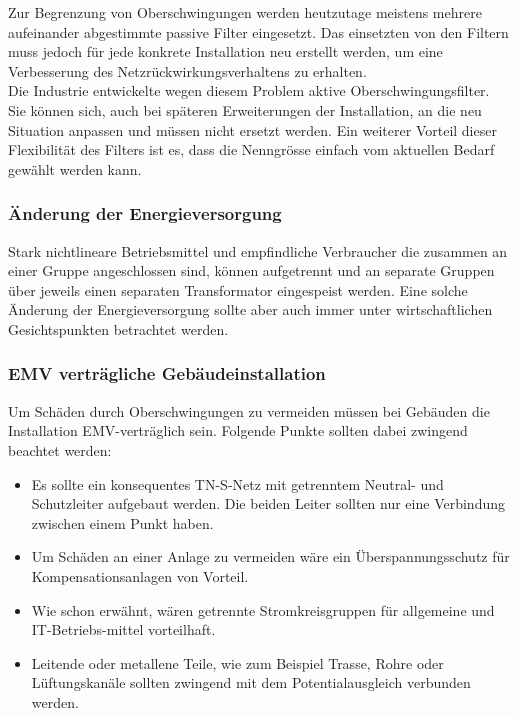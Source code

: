 Zur Begrenzung von Oberschwingungen werden heutzutage  meistens mehrere aufeinander abgestimmte passive Filter eingesetzt. Das einsetzten von den Filtern muss jedoch für jede konkrete Installation neu erstellt werden, um eine Verbesserung des Netzrückwirkungsverhaltens zu erhalten.\\
Die Industrie entwickelte wegen diesem Problem aktive Oberschwingungsfilter. Sie können sich, auch bei späteren Erweiterungen der Installation, an die neu Situation anpassen und müssen nicht ersetzt werden. Ein weiterer Vorteil dieser Flexibilität des Filters ist es, dass die Nenngrösse einfach vom aktuellen Bedarf gewählt werden kann.     

\subsubsection{Änderung der Energieversorgung}

Stark nichtlineare Betriebsmittel und empfindliche Verbraucher die zusammen an einer Gruppe angeschlossen sind, können aufgetrennt und an separate Gruppen über jeweils einen separaten Transformator eingespeist werden. Eine solche Änderung der Energieversorgung sollte aber auch immer unter wirtschaftlichen Gesichtspunkten betrachtet werden.

\subsubsection{EMV verträgliche Gebäudeinstallation}

Um Schäden durch Oberschwingungen zu vermeiden müssen bei Gebäuden die Installation EMV-verträglich sein.
Folgende Punkte sollten dabei zwingend beachtet werden:

\begin{itemize}
	\item Es sollte ein konsequentes TN-S-Netz mit getrenntem Neutral- und Schutzleiter aufgebaut werden. Die beiden Leiter sollten nur eine Verbindung zwischen einem Punkt haben.
	\item Um Schäden an einer Anlage zu vermeiden wäre ein Überspannungsschutz für Kompensationsanlagen von Vorteil.
	\item Wie schon erwähnt, wären getrennte Stromkreisgruppen für allgemeine und IT-Betriebs-mittel vorteilhaft.
	\item Leitende oder metallene Teile, wie zum Beispiel Trasse, Rohre oder Lüftungskanäle sollten zwingend mit dem Potentialausgleich verbunden werden.
	
\end{itemize}

